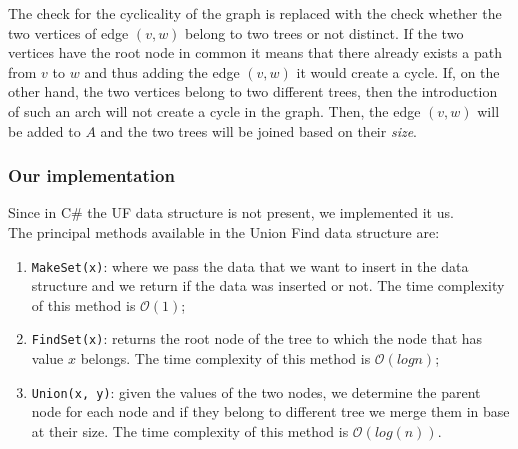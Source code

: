 The check for the cyclicality of the graph is replaced with the check whether the two vertices of edge $(v, w)$ 
belong to two trees or not distinct. If the two vertices have the root node in common it means that there already 
exists a path from $v$ to $w$ and thus adding the edge $(v, w)$ it would create a cycle.
If, on the other hand, the two vertices belong to two different trees, then the introduction of such an arch will 
not create a cycle in the graph.
Then, the edge $(v, w)$ will be added to $A$ and the two trees will be joined based on their \textit{size}.

\subsubsection{Our implementation}
Since in C\# the UF data structure is not present, we implemented it us.\\
The principal methods available in the Union Find data structure are:
\begin{enumerate}
    \item \verb|MakeSet(x)|: where we pass the data that we want to insert in the data structure and we return 
        if the data was inserted or not. The time complexity of this method is $\mathcal{O}(1)$;
    \item \verb|FindSet(x)|: returns the root node of the tree to which the node that has value $x$ belongs.
        The time complexity of this method is $\mathcal{O}(log n)$;
    \item \verb|Union(x, y)|: given the values of the two nodes, we determine the parent node for each node and 
        if they belong to different tree we merge them in base at their size. The time complexity of this 
        method is $\mathcal{O}(log(n))$.
\end{enumerate}


